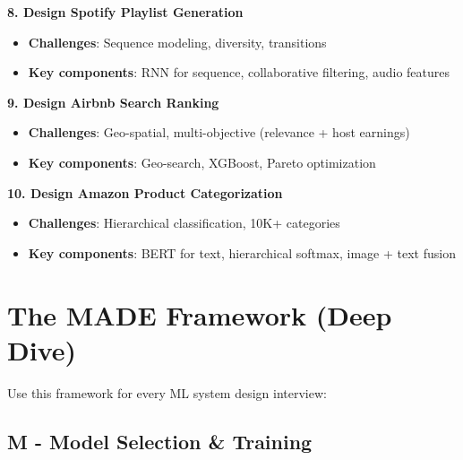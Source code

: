 \documentclass[10pt]{article}
\begin{document}
\textbf{8. Design Spotify Playlist Generation}
\begin{itemize}
\item \textbf{Challenges}: Sequence modeling, diversity, transitions
\item \textbf{Key components}: RNN for sequence, collaborative filtering, audio features
\end{itemize}

\textbf{9. Design Airbnb Search Ranking}
\begin{itemize}
\item \textbf{Challenges}: Geo-spatial, multi-objective (relevance + host earnings)
\item \textbf{Key components}: Geo-search, XGBoost, Pareto optimization
\end{itemize}

\textbf{10. Design Amazon Product Categorization}
\begin{itemize}
\item \textbf{Challenges}: Hierarchical classification, 10K+ categories
\item \textbf{Key components}: BERT for text, hierarchical softmax, image + text fusion
\end{itemize}

\section{The MADE Framework (Deep Dive)}

Use this framework for every ML system design interview:

\subsection{M - Model Selection \& Training}
\end{document}

